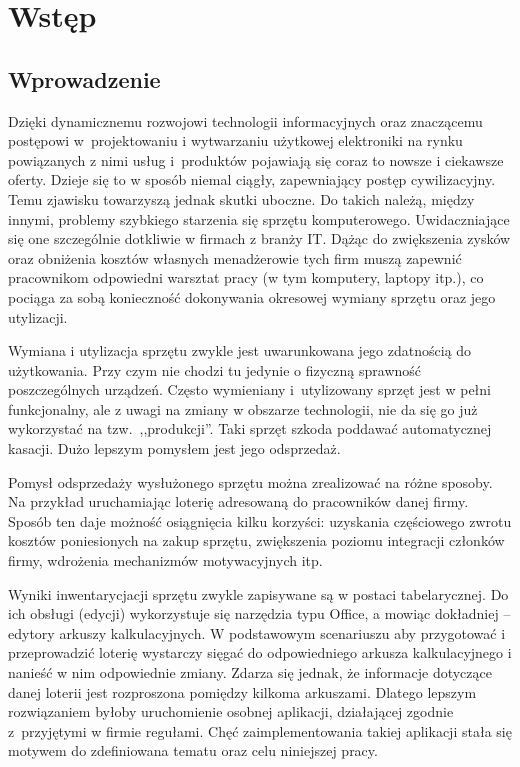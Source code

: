 \chapter{Wstęp}
\section{Wprowadzenie}
Dzięki dynamicznemu rozwojowi technologii informacyjnych oraz znaczącemu postępowi w~projektowaniu i wytwarzaniu użytkowej elektroniki na rynku powiązanych z nimi usług i~produktów pojawiają się coraz to nowsze i ciekawsze oferty. Dzieje się to w sposób niemal ciągły, zapewniający postęp cywilizacyjny. Temu zjawisku towarzyszą jednak skutki uboczne. Do takich należą, między innymi, problemy szybkiego starzenia się sprzętu komputerowego. Uwidaczniające się one szczególnie dotkliwie w firmach z branży IT. Dążąc do zwiększenia zysków oraz obniżenia kosztów własnych menadżerowie tych firm muszą zapewnić pracownikom odpowiedni warsztat pracy (w tym komputery, laptopy itp.), co pociąga za sobą konieczność dokonywania okresowej wymiany sprzętu oraz jego utylizacji.

Wymiana i utylizacja sprzętu zwykle jest uwarunkowana jego zdatnością do użytkowania. Przy czym nie chodzi tu jedynie o fizyczną sprawność poszczególnych urządzeń. Często wymieniany i~utylizowany sprzęt jest w pełni funkcjonalny, ale z uwagi na zmiany w obszarze technologii, nie da się go już wykorzystać na tzw.\ ,,produkcji''. Taki sprzęt szkoda poddawać automatycznej kasacji. Dużo lepszym pomysłem jest jego odsprzedaż. 

Pomysł odsprzedaży wysłużonego sprzętu można zrealizować na różne sposoby. Na przykład uruchamiając loterię adresowaną do pracowników danej firmy. Sposób ten daje możność osiągnięcia kilku korzyści: uzyskania częściowego zwrotu kosztów poniesionych na zakup sprzętu, zwiększenia poziomu integracji członków firmy, wdrożenia mechanizmów motywacyjnych itp.


Wyniki inwentarycjacji sprzętu zwykle zapisywane są w postaci tabelarycznej. Do ich obsługi (edycji) wykorzystuje się narzędzia typu Office, a mowiąc dokładniej -- edytory arkuszy kalkulacyjnych. W podstawowym scenariuszu aby przygotować i przeprowadzić loterię wystarczy sięgać do odpowiedniego arkusza kalkulacyjnego i nanieść w nim odpowiednie zmiany. Zdarza się jednak, że informacje dotyczące danej loterii jest rozproszona pomiędzy kilkoma arkuszami. Dlatego lepszym rozwiązaniem byłoby uruchomienie osobnej aplikacji, działającej zgodnie z~przyjętymi w firmie regułami. Chęć zaimplementowania takiej aplikacji stała się motywem do zdefiniowana tematu oraz celu niniejszej pracy.

